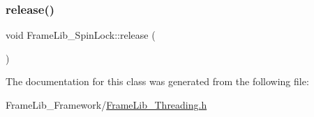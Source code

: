 \mbox{\label{class_frame_lib___spin_lock_a99190b01885c12923f76822d1ba7fb1f}} 
\subsubsection{\texorpdfstring{release()}{release()}}
{\footnotesize\ttfamily void Frame\+Lib\+\_\+\+Spin\+Lock\+::release (\begin{DoxyParamCaption}{ }\end{DoxyParamCaption})\hspace{0.3cm}{\ttfamily [inline]}}



The documentation for this class was generated from the following file\+:\begin{DoxyCompactItemize}
\item 
Frame\+Lib\+\_\+\+Framework/\hyperlink{_frame_lib___threading_8h}{Frame\+Lib\+\_\+\+Threading.\+h}\end{DoxyCompactItemize}
